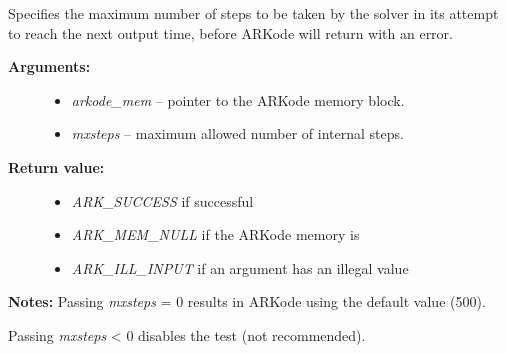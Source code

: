 \documentclass[letterpaper,10pt,english]{sphinxmanual}
\begin{document}
\begin{fulllineitems}
\label{c_interface/User_callable:c.ARKodeSetMaxNumSteps}
Specifies the maximum number of steps to be taken by the
solver in its attempt to reach the next output time, before ARKode
will return with an error.
\begin{description}
\item[{\textbf{Arguments:}}] \leavevmode\begin{itemize}
\item {} 
\emph{arkode\_mem} -- pointer to the ARKode memory block.

\item {} 
\emph{mxsteps} -- maximum allowed number of internal steps.

\end{itemize}

\item[{\textbf{Return value:}}] \leavevmode\begin{itemize}
\item {} 
\emph{ARK\_SUCCESS} if successful

\item {} 
\emph{ARK\_MEM\_NULL} if the ARKode memory is 

\item {} 
\emph{ARK\_ILL\_INPUT} if an argument has an illegal value

\end{itemize}

\end{description}

\textbf{Notes:} Passing \emph{mxsteps} = 0 results in ARKode using the
default value (500).

Passing \emph{mxsteps} \textless{} 0 disables the test (not recommended).

\end{fulllineitems}

\end{document}

